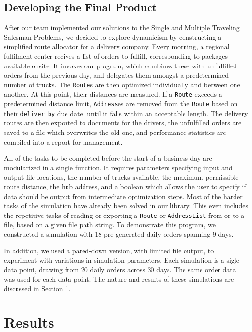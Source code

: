 \documentclass[letterpaper]{article}
\begin{document}
    \subsection{Developing the Final Product}
    \label{subsection:Developing_the_Final_Product}
    After our team implemented our solutions to the Single and Multiple Traveling Salesman Problems, we decided to explore dynamicism by constructing a simplified route allocator for a delivery company. Every morning, a regional fulfilment center recives a list of orders to fulfill, corresponding to packages available onsite. It invokes our program, which combines these with unfulfilled orders from the previous day, and delegates them amongst a predetermined number of trucks. The \verb|Route|s are then optimized individually and between one another. At this point, their distances are measured. If a \verb|Route| exceeds a predetermined distance limit, \verb|Address|es are removed from the \verb|Route| based on their \verb|deliver_by| due date, until it falls within an acceptable length. The delivery routes are then exported to documents for the drivers, the unfulfilled orders are saved to a file which overwrites the old one, and performance statistics are compiled into a report for management.

    All of the tasks to be completed before the start of a business day are modularized in a single function. It requires parameters specifying input and output file locations, the number of trucks available, the maximum permissible route distance, the hub address, and a boolean which allows the user to specify if data should be output from intermediate optimization steps. Most of the harder tasks of the simulation have already been solved in our library. This even includes the repetitive tasks of reading or exporting a \verb|Route| or \verb|AddressList| from or to a file, based on a given file path string. To demonstrate this program, we constructed a simulation with 18 pre-generated daily orders spanning 9 days.
    
    In addition, we used a pared-down version, with limited file output, to experiment with variations in simulation parameters. Each simulation is a sigle data point, drawing from 20 daily orders across 30 days. The same order data was used for each data point. The nature and results of these simulations are discussed in Section \ref{section:Results}.

    \section{Results}
    \label{section:Results}
\end{document}
